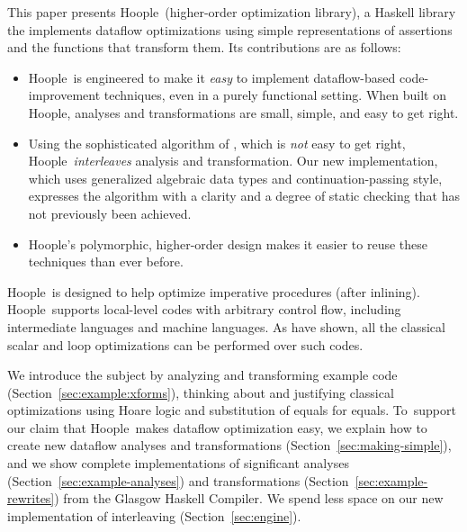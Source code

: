 \documentclass[blockstyle,preprint,natbib,nocopyrightspace]{sigplanconf}
\newcommand\ourlib{Hoople}  %
\let\hoopl\ourlib
\newcommand\secref[1]{Section~\ref{sec:#1}}
\begin{document}
This paper presents \ourlib\ (higher-order optimization library), 
a Haskell library the implements dataflow optimizations using
simple representations of assertions and the functions that transform
them.
Its contributions are as follows:
\begin{itemize}
\item
\ourlib\ is engineered to make it \emph{easy} to implement
dataflow-based 
code-improvement techniques, even in a purely functional setting.
When built on \ourlib, analyses and transformations
are small, simple, and easy to get right.
\item 
Using the sophisticated algorithm of \citet{lerner-grove-chambers:2002},
 which is \emph{not} easy to get right,
\ourlib\ \emph{interleaves} analysis and transformation.
Our new implementation, which uses generalized
algebraic data 
types
and continuation-passing style,
expresses the algorithm with a clarity and a degree of
static checking that has not 
previously been achieved.
\item
\ourlib's polymorphic, higher-order design makes it easier to reuse
these techniques than ever before.
\end{itemize}
%
\hoopl\ is designed to help optimize imperative procedures (after
inlining). 
\ourlib\ supports local-level codes with arbitrary control flow,
including intermediate 
languages and machine 
languages.
As \citet{benitez-davidson:portable-optimizer} have shown, all the
classical scalar and loop optimizations can be performed over such
codes.



We introduce the subject by analyzing and transforming example code 
(\secref{example:xforms}),
thinking about and justifying classical optimizations using
Hoare logic and substitution of equals for equals.
To~support our claim that \ourlib\ makes dataflow optimization easy, 
we explain how
to create new dataflow analyses and transformations
(\secref{making-simple}), and we show complete implementations of significant
analyses (\secref{example-analyses}) and transformations
(\secref{example-rewrites}) from the Glasgow Haskell Compiler.
We spend less space on our new implementation of interleaving (\secref{engine}).
\end{document}
